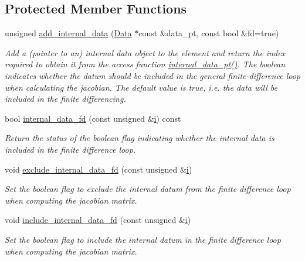 \subsection*{Protected Member Functions}
\begin{DoxyCompactItemize}
\item 
unsigned \hyperlink{classoomph_1_1GeneralisedElement_a36571ae9c4b6d2a26c36004e5be88389}{add\+\_\+internal\+\_\+data} (\hyperlink{classoomph_1_1Data}{Data} $\ast$const \&data\+\_\+pt, const bool \&fd=true)
\begin{DoxyCompactList}\small\item\em Add a (pointer to an) internal data object to the element and return the index required to obtain it from the access function {\ttfamily \hyperlink{classoomph_1_1GeneralisedElement_a45e32d895d4b3686e0f15fe455f4ed44}{internal\+\_\+data\+\_\+pt()}}. The boolean indicates whether the datum should be included in the general finite-\/difference loop when calculating the jacobian. The default value is true, i.\+e. the data will be included in the finite differencing. \end{DoxyCompactList}\item 
bool \hyperlink{classoomph_1_1GeneralisedElement_a267f0eb0e548ea9b4908d1076370ba95}{internal\+\_\+data\+\_\+fd} (const unsigned \&\hyperlink{cfortran_8h_adb50e893b86b3e55e751a42eab3cba82}{i}) const
\begin{DoxyCompactList}\small\item\em Return the status of the boolean flag indicating whether the internal data is included in the finite difference loop. \end{DoxyCompactList}\item 
void \hyperlink{classoomph_1_1GeneralisedElement_a3609beaea7104b223d6f7750f071f023}{exclude\+\_\+internal\+\_\+data\+\_\+fd} (const unsigned \&\hyperlink{cfortran_8h_adb50e893b86b3e55e751a42eab3cba82}{i})
\begin{DoxyCompactList}\small\item\em Set the boolean flag to exclude the internal datum from the finite difference loop when computing the jacobian matrix. \end{DoxyCompactList}\item 
void \hyperlink{classoomph_1_1GeneralisedElement_a76c12b675e16b3ad2f44a59af36aa2af}{include\+\_\+internal\+\_\+data\+\_\+fd} (const unsigned \&\hyperlink{cfortran_8h_adb50e893b86b3e55e751a42eab3cba82}{i})
\begin{DoxyCompactList}\small\item\em Set the boolean flag to include the internal datum in the finite difference loop when computing the jacobian matrix. \end{DoxyCompactList}\item 

\end{DoxyCompactItemize}
